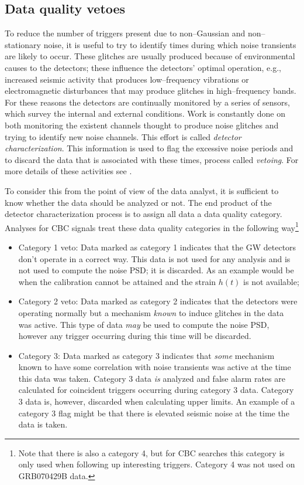 \subsection{Data quality vetoes}
To reduce the number of triggers present due to non--Gaussian and non--stationary noise, it is useful
to try to identify times during which noise transients are likely to occur. These glitches are usually produced because of environmental causes to the detectors; these influence the detectors' optimal operation, e.g., increased seismic activity that produces low--frequency vibrations or electromagnetic disturbances that may produce glitches in high--frequency bands. For these reasons the detectors are continually monitored by a series of sensors, which survey the internal and external conditions. Work is constantly done on both monitoring the existent channels thought to produce noise glitches and trying to identify new noise channels. This effort is called \emph{detector characterization}. This information is used to flag the excessive noise periods and to discard the data that is associated with these times, process called \emph{vetoing}. For more details of these activities see \cite{Blackburn:2008ah,Macleod:2011up}.

To consider this from the point of view of the data analyst, it is sufficient to know whether
the data should be analyzed or not. The end product of the detector characterization process
is to assign all data a data quality category. Analyses for CBC signals treat these
data quality categories in the following way\footnote{
Note that there is also a category 4, but for CBC searches this category is only used when following up interesting triggers. Category 4 was not used on GRB070429B data.}
%
\begin{itemize}
 \item Category 1 veto: Data marked as category 1 indicates that the GW detectors don't operate in a correct way. This data is not used for any analysis and is not used to compute the noise PSD; it is discarded. As an example would be when the calibration cannot be attained and the strain $h(t)$ is not available; 
 \item Category 2 veto: Data marked as category 2 indicates that the detectors were operating normally but a mechanism \emph{known} to induce glitches in the data was active. This type of data \emph{may} be used to compute the noise PSD, however any trigger occurring during this time will be discarded.
 \item Category 3: Data marked as category 3 indicates that \emph{some} mechanism known to have some correlation with noise transients was active at the time this data was taken. Category 3 data \textit{is} analyzed and false alarm rates are calculated for coincident triggers occurring during category 3 data. Category 3 data is, however, discarded when calculating upper limits. An example
of a category 3 flag might be that there is elevated seismic noise at the time the data is
taken.
\end{itemize}

